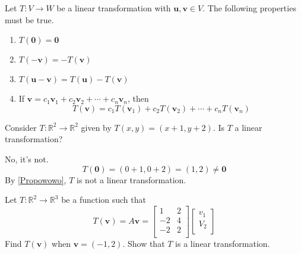 \begin{theorem}\label{Propowowo}
    Let \(T:V\to W\) be a linear transformation with \(\mathbf{u} ,\mathbf{v} \in V\). The following properties must be true.
    \begin{enumerate}
        \item \(T(\mathbf{0} )=\mathbf{0} \) 
        \item \(T(-\mathbf{v} )=-T(\mathbf{v} )\)
        \item \(T(\mathbf{u} -\mathbf{v} )=T(\mathbf{u} )-T(\mathbf{v} )\) 
        \item If \(\mathbf{v} =c_1 \mathbf{v} _1 +c_2 \mathbf{v} _2 + \cdots + c_n \mathbf{v} _n\), then
        \[
            T(\mathbf{v} )= c_1 T \left( \mathbf{v} _1 \right) + c_2 T \left( \mathbf{v} _2 \right) + \cdots + c_n T \left( \mathbf{v} _n \right) 
        \] 
    \end{enumerate}
\end{theorem}
\begin{exercise}
    Consider \(T:\mathbb{R} ^2 \to \mathbb{R} ^2\) given by \(T(x,y)= (x+1,y+2)\). Is \(T\) a linear transformation?
\end{exercise}
\begin{solution}
    No, it's not. 
    \[
        T(\mathbf{0} ) = (0+1,0+2)=(1,2)\neq \mathbf{0} 
    \]
    By \ref{Propowowo}, \(T\) is not a linear transformation.
\end{solution}
\begin{exercise}
    Let \(T:\mathbb{R} ^2 \to \mathbb{R} ^3\) be a function such that 
    \[
        T(\mathbf{v} )=A \mathbf{v} =\begin{bmatrix}
            1 &2   \\
            -2 &4   \\
             -2&2   \\
        \end{bmatrix} \begin{bmatrix}
             v_1 \\
              V_2\\
        \end{bmatrix}
    \]
    Find \(T(\mathbf{v} )\) when \(\mathbf{v} =(-1,2)\). Show that \(T\) is a linear transformation.
\end{exercise}
